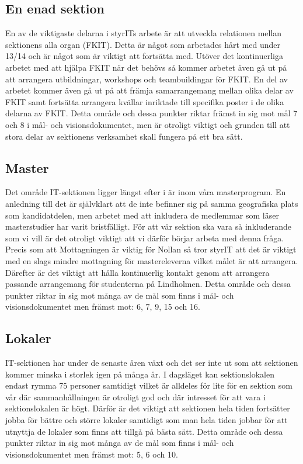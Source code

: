 \documentclass[11pt, includeaddress]{classes/cthit}
\begin{document}
\subsection{En enad sektion}
En av de viktigaste delarna i styrITs arbete är att utveckla relationen mellan sektionens alla organ (FKIT). Detta är något som arbetades hårt med under 13/14 och är något som är viktigt att fortsätta med. Utöver det kontinuerliga arbetet med att hjälpa FKIT när det behövs så kommer arbetet även gå ut på att arrangera utbildningar, workshops och teambuildingar för FKIT. En del av arbetet kommer även gå ut på att främja samarrangemang mellan olika delar av FKIT samt fortsätta arrangera kvällar inriktade till specifika poster i de olika delarna av FKIT.
\newline
\newline
Detta område och dessa punkter riktar främst in sig mot mål 7 och 8 i mål- och visionsdokumentet, men är otroligt viktigt och grunden till att stora delar av sektionens verksamhet skall fungera på ett bra sätt.

\subsection{Master}
Det område IT-sektionen ligger längst efter i är inom våra masterprogram. En anledning till det är självklart att de inte befinner sig på samma geografiska plats som kandidatdelen, men arbetet med att inkludera de medlemmar som läser masterstudier har varit bristfälligt. För att vår sektion ska vara så inkluderande som vi vill är det otroligt viktigt att vi därför börjar arbeta med denna fråga. Precis som att Mottagningen är viktig för Nollan så tror styrIT att det är viktigt med en slags mindre mottagning för mastereleverna vilket målet är att arrangera. Därefter är det viktigt att hålla kontinuerlig kontakt genom att arrangera passande arrangemang för studenterna på Lindholmen.
\newline
\newline
Detta område och dessa punkter riktar in sig mot många av de mål som finns i mål- och visionsdokumentet men främst mot: 6, 7, 9, 15 och 16.

\subsection{Lokaler}
IT-sektionen har under de senaste åren växt och det ser inte ut som att sektionen kommer minska i storlek igen på många år. I dagsläget kan sektionslokalen endast rymma 75 personer samtidigt vilket är alldeles för lite för en sektion som vår där sammanhållningen är otroligt god och där intresset för att vara i sektionslokalen är högt. Därför är det viktigt att sektionen hela tiden fortsätter jobba för bättre och större lokaler samtidigt som man hela tiden jobbar för att utnyttja de lokaler som finns att tillgå på bästa sätt.
\newline
\newline
Detta område och dessa punkter riktar in sig mot många av de mål som finns i mål- och visionsdokumentet men främst mot: 5, 6 och 10.
\end{document}
